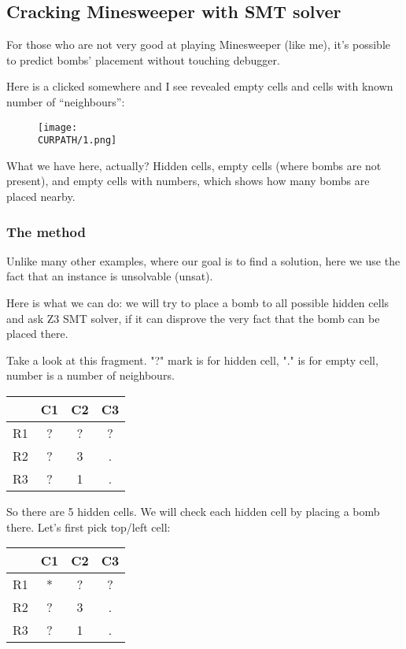 \subsection{Cracking Minesweeper with SMT solver}
\label{minesweeper_SMT}

\renewcommand{\CURPATH}{equations/minesweeper/1_SMT}

For those who are not very good at playing Minesweeper (like me), it's possible to predict bombs' placement without touching debugger.

Here is a clicked somewhere and I see revealed empty cells and cells with known number of ``neighbours'':

\begin{figure}[H]
\centering
\texttt{[image: \\CURPATH/1.png]}
\end{figure}

What we have here, actually? Hidden cells, empty cells (where bombs are not present), and empty cells with numbers, which shows how many bombs are placed nearby.

\subsubsection{The method}

Unlike many other examples, where our goal is to find a solution, here we use the fact that an instance is unsolvable (unsat).

Here is what we can do: we will try to place a bomb to all possible hidden cells and ask Z3 SMT solver,
if it can disprove the very fact that the bomb can be placed there.

Take a look at this fragment. "?" mark is for hidden cell, "." is for empty cell, number is a number of neighbours.

\begin{center}
\begin{tabular}{ | c | c | c | c | }
\hline
 & C1 & C2 & C3 \\
\hline
R1 & ? & ? & ? \\
\hline
R2 & ? & 3 & . \\
\hline
R3 & ? & 1 & . \\
\hline
\end{tabular}
\end{center}

So there are 5 hidden cells.
We will check each hidden cell by placing a bomb there.
Let's first pick top/left cell:

\begin{center}
\begin{tabular}{ | c | c | c | c | }
\hline
 & C1 & C2 & C3 \\
\hline
R1 & * & ? & ? \\
\hline
R2 & ? & 3 & . \\
\hline
R3 & ? & 1 & . \\
\hline
\end{tabular}
\end{center}

